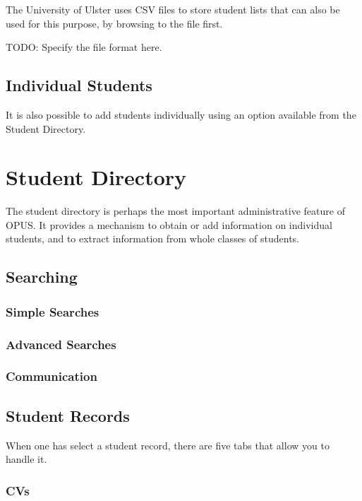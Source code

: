 \documentclass[12 pt]{book}
\begin{document}
The University of Ulster uses CSV files to store student lists that can also be used for this
purpose, by browsing to the file first.

TODO: Specify the file format here.

\section{Individual Students}

It is also possible to add students individually using an option available from the Student
Directory.

\chapter{Student Directory}

The student directory is perhaps the most important administrative feature of OPUS. It provides
a mechanism to obtain or add information on individual students, and to extract information from
whole classes of students.

\section{Searching}

\subsection{Simple Searches}

\subsection{Advanced Searches}

\subsection{Communication}

\section{Student Records}

When one has select a student record, there are five tabs that allow you to handle it.

\subsection{CVs}
\end{document}

